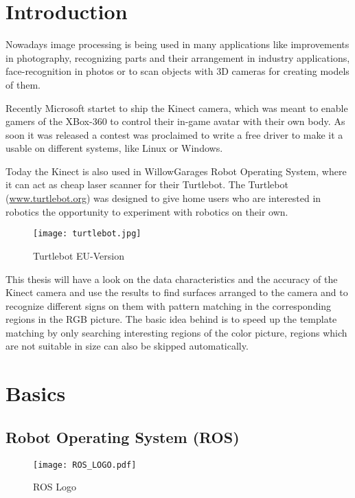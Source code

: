 \chapter{Introduction}
\graphicspath{{./Introduction/img/}}

Nowadays image processing is being used in many applications like improvements in
photography, recognizing parts and their arrangement in industry applications, 
face-recognition in photos or to scan objects with 3D cameras for creating
models of them.

Recently Microsoft startet to ship the Kinect camera, which was meant to enable
gamers of the XBox-360 to control their in-game avatar with their own body.
As soon it was released a contest was proclaimed to write a free driver to make it a
usable on different systems, like Linux or Windows.

Today the Kinect is also used in WillowGarages Robot Operating System,
where it can act as cheap laser scanner for their Turtlebot. The Turtlebot 
(\url{www.turtlebot.org}) was designed to give home users who are interested in 
robotics the opportunity to experiment with robotics on their own.

\begin{figure}[htp]
\begin{center}
  \texttt{[image: turtlebot.jpg]}
  \caption{Turtlebot EU-Version}
  \label{figure:turtlebot}
\end{center}
\end{figure}

This thesis will have a look on the data characteristics and the accuracy of the
Kinect camera and use the results to find surfaces arranged to the camera and to 
recognize different signs on them with pattern matching in the corresponding regions
in the RGB picture. The basic idea behind is to speed up the template matching 
by only searching interesting regions of the color picture, regions which are not
suitable in size can also be skipped automatically.

\chapter{Basics}

\section{Robot Operating System (ROS)}
  
\begin{figure}[htp]
	\centering
	\texttt{[image: ROS\_LOGO.pdf]}
	\caption{ROS Logo}
\end{figure} 

